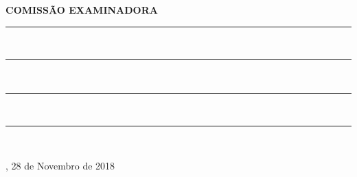 %
%

\makeatletter
\begin{folhadeaprovacao}

\thispagestyle{empty}%

	\vspace*{\fill}%
	    \large%
		\hfill%
    	\begin{minipage}{10 cm}%
  			\begin{center}%
	    	\vspace*{1.21 cm}%
			\textbf{COMISSÃO EXAMINADORA}\\ %
					
			\vspace*{1 cm}%
			\rule{10 cm}{.1 mm}\\
			
			\vspace*{1 cm}%
			\rule{10 cm}{.1 mm}\\

			\vspace*{1 cm}%
			\rule{10 cm}{.1 mm}\\

			\vspace*{1 cm}%
			\rule{10 cm}{.1 mm}\\
							
		    \end{center}%
	    \end{minipage}%
		    	
	    \vspace*{2 cm}%
	    \begin{flushright}
            {\imprimirlocal}, 28 de Novembro de 2018
        \end{flushright}

\end{folhadeaprovacao}
\makeatother
